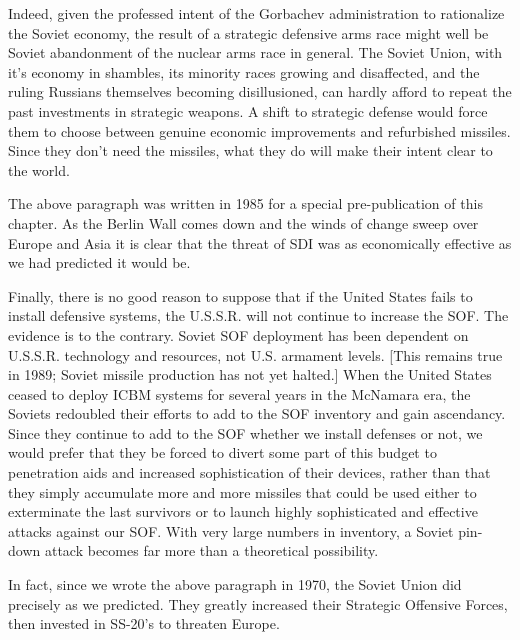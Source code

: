 Indeed, given the professed intent of the Gorbachev administration to rationalize the Soviet economy, the result of a strategic defensive arms race might well be Soviet abandonment of the nuclear arms race in general. The Soviet Union, with it's economy in shambles, its minority races growing and disaffected, and the ruling Russians themselves becoming disillusioned, can hardly afford to repeat the past investments in strategic weapons. A shift to strategic defense would force them to choose between genuine economic improvements and refurbished missiles. Since they don't need the missiles, what they do will make their intent clear to the world.

\begin{mdframed}[backgroundcolor=black!10]
The above paragraph was written in 1985 for a special pre-publication of this chapter. As the Berlin Wall comes down and the winds of change sweep over Europe and Asia it is clear that the threat of SDI was as economically effective as we had predicted it would be.
\end{mdframed}

Finally, there is no good reason to suppose that if the United States fails to install defensive systems, the U.S.S.R. will not continue to increase the SOF. The evidence is to the contrary. Soviet SOF deployment has been dependent on U.S.S.R. technology and resources, not U.S. armament levels. [This remains true in 1989; Soviet missile production has not yet halted.] When the United States ceased to deploy ICBM systems for several years in the McNamara era, the Soviets redoubled their efforts to add to the SOF inventory and gain ascendancy. Since they continue to add to the SOF whether we install defenses or not, we would prefer that they be forced to divert some part of this budget to penetration aids and increased sophistication of their devices, rather than that they simply accumulate more and more missiles that could be used either to exterminate the last survivors or to launch highly sophisticated and effective attacks against our SOF. With very large numbers in inventory, a Soviet pin-down attack becomes far more than a theoretical possibility.

\begin{mdframed}[backgroundcolor=black!10]
In fact, since we wrote the above paragraph in 1970, the Soviet Union did precisely as we predicted. They greatly increased their Strategic Offensive Forces, then invested in SS-20's to threaten Europe.
\end{mdframed}

